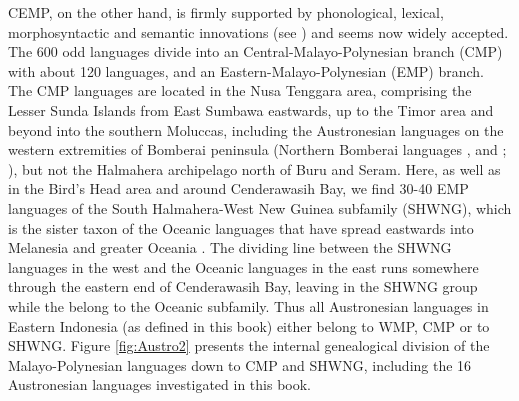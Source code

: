 CEMP, on the other hand, is firmly supported by phonological, lexical, morphosyntactic and semantic innovations (see \citealt{blust1993central}) and seems now widely accepted. The 600 odd languages divide into an Central-Malayo-Polynesian branch (CMP) with about 120 languages, and an Eastern-Malayo-Polynesian (EMP) branch. The CMP languages are located in the Nusa Tenggara area, comprising the Lesser Sunda Islands from East Sumbawa eastwards, up to the Timor area and beyond into the southern Moluccas, including the Austronesian languages on the western extremities of Bomberai peninsula (Northern Bomberai languages ,  and ; \citealt[24]{adelaar2005austronesian}), but not the Halmahera archipelago north of Buru and Seram. Here, as well as in the Bird's Head area and around Cenderawasih Bay, we find 30-40 EMP languages of the South Halmahera-West New Guinea subfamily (SHWNG), which is the sister taxon of the Oceanic languages that have spread eastwards into Melanesia and greater Oceania \citep{blust2009austronesian}. The dividing line between the SHWNG languages in the west and the Oceanic languages in the east runs somewhere through the eastern end of Cenderawasih Bay, leaving  in the SHWNG group while the  belong to the Oceanic subfamily. Thus all Austronesian languages in Eastern Indonesia (as defined in this book) either belong to WMP, CMP or to SHWNG. Figure \ref{fig:Austro2} presents the internal genealogical division of the Malayo-Polynesian languages down to CMP and SHWNG, including the 16 Austronesian languages investigated in this book.

